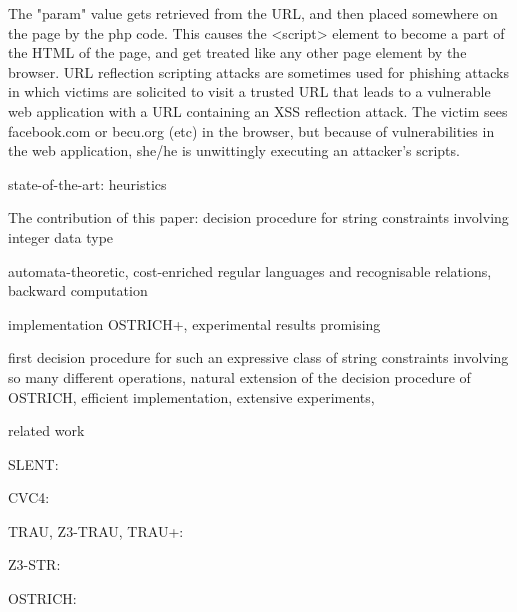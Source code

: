 The "param" value gets retrieved from the URL, and then placed somewhere on the page by the php code. 
This causes the <script> element to become a part of the HTML of the page, and get treated like any other page element by the browser.
URL reflection scripting attacks are sometimes used for phishing attacks in which victims are solicited to visit a trusted URL that leads to 
a vulnerable web application with a URL containing an XSS reflection attack. The victim sees facebook.com or becu.org (etc) in the browser, 
but because of vulnerabilities in the web application, she/he is unwittingly executing an attacker's scripts. 


state-of-the-art: heuristics

The contribution of this paper: decision procedure for string constraints involving integer data type

automata-theoretic, cost-enriched regular languages and recognisable relations, backward computation

implementation OSTRICH+, experimental results promising

first decision procedure for such an expressive class of string constraints involving so many different operations, natural extension of the decision procedure of OSTRICH, efficient implementation, extensive experiments, 


related work

SLENT: \cite{WC+18}

CVC4: \cite{cvc4}

TRAU, Z3-TRAU, TRAU+: \cite{Abdulla17,AbdullaA+19}

Z3-STR: \cite{Z3-str}

OSTRICH: \cite{CHL+19}